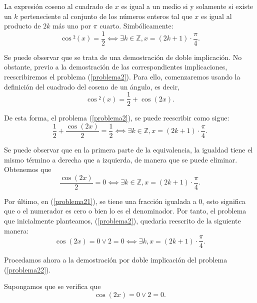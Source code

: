 \begin{lema}[SolucionCosenoCuadrado]La expresión coseno al
  cuadrado de \(x\) es igual a un medio si y solamente si
  existe un \(k\) perteneciente al conjunto de los números
  enteros tal que \(x\) es igual al producto de \(2k\) más
  uno por \(π\) cuarto. Simbólicamente:
  \begin{equation}\label{problema2}
    \cos²(x)=\frac{1}{2} ⟺∃ k∈ℤ, x=(2k+1)⋅\frac{π}{4}.
  \end{equation}
\end{lema}
\begin{demostracion}
  Se puede observar que se trata de una demostración de doble
  implicación. No obstante, previo a la demostración de las
  correspondientes implicaciones, reescribiremos el problema
  (\ref{problema2}). Para ello, comenzaremos usando la definición
  del cuadrado del coseno de un ángulo, es decir,
  \begin{equation}
    \cos²(x)=\frac{1}{2}+\cos(2x).
  \end{equation}

  De esta forma, el problema (\ref{problema2}), se puede reescribir
  como sigue:
  \begin{equation}
    \frac{1}{2}+\frac{\cos(2x)}{2}=\frac{1}{2} ⟺∃ k∈ℤ, x=(2k+1)⋅
    \frac{π}{4}.
  \end{equation}

  Se puede observar que en la primera parte de la equivalencia, la
  igualdad tiene el mismo término a derecha que a izquierda, de
  manera que se puede eliminar. Obtenemos que
  \begin{equation}\label{problema21}
    \frac{\cos(2x)}{2}=0 ⟺ ∃ k∈ℤ, x=(2k+1)⋅\frac{π}{4}.
  \end{equation}

  Por último, en (\ref{problema21}), se tiene una fracción igualada
  a 0, esto significa que o el numerador es cero o bien lo es el
  denominador. Por tanto, el problema que inicialmente planteamos,
  (\ref{problema2}), quedaría reescrito de la siguiente manera:
  \begin{equation}\label{problema22}
    \cos(2x)=0 \lor 2=0 ⟺∃ k, x=(2k+1)⋅\frac{π}{4}.
  \end{equation}

  Procedamos ahora a la demostración por doble implicación del
  problema (\ref{problema22}).

  \noindent
  \framebox{\longrightarrow} Supongamos que se verifica que
  \begin{equation}\label{Dobleh2}\tag{h1}
    \cos(2x)=0 \lor 2=0.
  \end{equation}


\end{demostracion}
